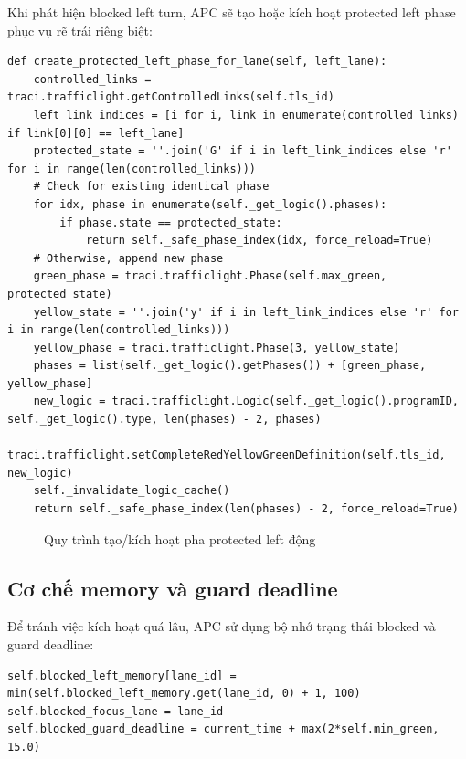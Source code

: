 Khi phát hiện blocked left turn, APC sẽ tạo hoặc kích hoạt protected left phase phục vụ rẽ trái riêng biệt:

\begin{lstlisting}[style=py,caption={Hàm create\_protected\_left\_phase\_for\_lane}]
def create_protected_left_phase_for_lane(self, left_lane):
    controlled_links = traci.trafficlight.getControlledLinks(self.tls_id)
    left_link_indices = [i for i, link in enumerate(controlled_links) if link[0][0] == left_lane]
    protected_state = ''.join('G' if i in left_link_indices else 'r' for i in range(len(controlled_links)))
    # Check for existing identical phase
    for idx, phase in enumerate(self._get_logic().phases):
        if phase.state == protected_state:
            return self._safe_phase_index(idx, force_reload=True)
    # Otherwise, append new phase
    green_phase = traci.trafficlight.Phase(self.max_green, protected_state)
    yellow_state = ''.join('y' if i in left_link_indices else 'r' for i in range(len(controlled_links)))
    yellow_phase = traci.trafficlight.Phase(3, yellow_state)
    phases = list(self._get_logic().getPhases()) + [green_phase, yellow_phase]
    new_logic = traci.trafficlight.Logic(self._get_logic().programID, self._get_logic().type, len(phases) - 2, phases)
    traci.trafficlight.setCompleteRedYellowGreenDefinition(self.tls_id, new_logic)
    self._invalidate_logic_cache()
    return self._safe_phase_index(len(phases) - 2, force_reload=True)
\end{lstlisting}

\begin{figure}[H]
    \centering
    \caption{Quy trình tạo/kích hoạt pha protected left động}
    \label{fig:protected_left_phase_diagram}
\end{figure}

\subsection{Cơ chế memory và guard deadline}

Để tránh việc kích hoạt quá lâu, APC sử dụng bộ nhớ trạng thái blocked và guard deadline:

\begin{lstlisting}[style=py,caption={Cơ chế memory và guard deadline}]
self.blocked_left_memory[lane_id] = min(self.blocked_left_memory.get(lane_id, 0) + 1, 100)
self.blocked_focus_lane = lane_id
self.blocked_guard_deadline = current_time + max(2*self.min_green, 15.0)
\end{lstlisting}

